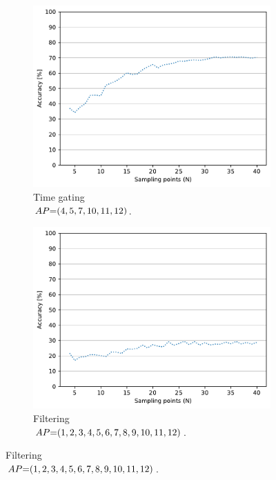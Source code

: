 \begin{figure}[ht]
  \begin{subfigure}{.49\textwidth}
    \centering
    \includegraphics[width=.99\linewidth]{Figures/RadarExperiments/Datasets/ThroughMaterials/PVC+Wood/samples-timegating-ud.pdf}
    \vspace{-15pt}
    \captionsetup{width=.99\linewidth}
    \caption{Time gating \\ $\splitatcommas{AP{=}(4, 5, 7, 10, 11, 12)}$.}
    \label{fig:radar-experiments:through-materials:pvc-wood-samples:timegating-ud}
  \end{subfigure}
  \begin{subfigure}{.49\textwidth}
    \centering
    \includegraphics[width=.99\linewidth]{Figures/RadarExperiments/Datasets/ThroughMaterials/PVC+Wood/samples-filtering-ud.pdf}  
    \vspace{-15pt}
    \captionsetup{width=.99\linewidth}
    \caption{Filtering \\ $\splitatcommas{AP{=}(1, 2, 3, 4, 5, 6, 7, 8, 9, 10, 11, 12)}$.}
    \label{fig:radar-experiments:through-materials:pvc-wood-samples:filtering-ud}
  \end{subfigure}


\end{figure}
